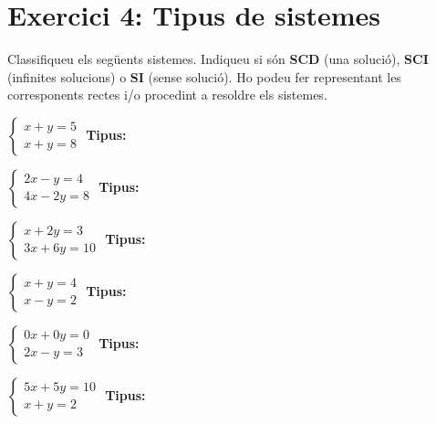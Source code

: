 \documentclass[12pt,a4paper]{article}
\begin{document}
\newpage

\section*{Exercici 4: Tipus de sistemes}
Classifiqueu els següents sistemes. Indiqueu si són \textbf{SCD} (una solució), \textbf{SCI} (infinites solucions) o \textbf{SI} (sense solució). Ho podeu fer representant les corresponents rectes i/o procedint a resoldre els sistemes.

\begin{enumerate}[label=\alph*), itemsep=1cm]
    \begin{minipage}[t]{0.45\textwidth}
    \item $\begin{cases} x + y = 5 \\ x + y = 8 \end{cases}$ \textbf{Tipus:} \\ 
    \item $\begin{cases} 2x - y = 4 \\ 4x - 2y = 8 \end{cases}$ \textbf{Tipus:} \\ 
    \item $\begin{cases} x + 2y = 3 \\ 3x + 6y = 10 \end{cases}$ \textbf{Tipus:} \\ 
    \end{minipage}
    \begin{minipage}[t]{0.45\textwidth}
    \item $\begin{cases} x + y = 4 \\ x - y = 2 \end{cases}$ \textbf{Tipus:} \\ 
    \item $\begin{cases} 0x + 0y = 0 \\ 2x - y = 3 \end{cases}$ \textbf{Tipus:} \\ 
    \item $\begin{cases} 5x + 5y = 10 \\ x + y = 2 \end{cases}$ \textbf{Tipus:} \\ 
    \end{minipage}
\end{enumerate}
\end{document}
